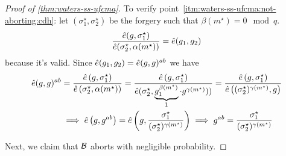 \begin{proof}[Proof of \cref{thm:waters-ss-ufcma}]
	To verify point~\ref{itm:waters-ss-ufcma:not-aborting:cdh}:
	let $(\sigma_1^{\star}, \sigma_2^{\star})$ be the forgery such that $\beta(m^{\star}) = 0 \mod q$.
	\begin{equation*}
		\frac{\hat{e}(g, \sigma_1^{\star})}{\hat{e}(\sigma_2^{\star}, \alpha(m^{\star}))} =
		\hat{e}(g_1, g_2)
	\end{equation*}
	because it's valid.
	Since $\hat{e}(g_1, g_2) = \hat{e}(g, g)^{ab}$ we have
	\begin{align*}
		\hat{e}(g, g)^{ab} & =
		\frac{
			\hat{e}\left(g, \sigma_1^{\star}\right)
		}{
			\hat{e}\left(\sigma_2^{\star}, \alpha(m^{\star})\right)
		} =
		\frac{
			\hat{e}\left(g, \sigma_1^{\star}\right)
		}{
			\hat{e}(\sigma_2^{\star}, \underbrace{g_1^{\beta(m^{\star})}}_{1} \cdot g^{\gamma(m^{\star})}))
		}
		=
		\frac{
			\hat{e}\left(g, \sigma_1^{\star}\right)
		}{
			\hat{e}\left((\sigma_2^{\star})^{\gamma(m^{\star})}, g\right)
		} \\
		& \implies
		\hat{e}\left(g, g^{ab}\right) =
		\hat{e}\left(g, \frac{\sigma_1^{\star}}{(\sigma_2^{\star})^{\gamma(m^{\star})}}\right)
		\implies
		g^{ab} = 
		\frac{\sigma_1^{\star}}{(\sigma_2^{\star})^{\gamma(m^{\star})}}
	\end{align*}

	Next, we claim that $\mathcal{B}$ aborts with negligible probability.


\end{proof}
